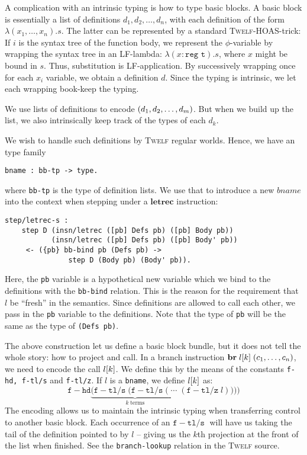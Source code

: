 \documentclass[a4paper, oneside, 10pt, draft]{memoir}
\newcommand{\twelf}{\textsc{Twelf}}
\begin{document}
A complication with an intrinsic typing is how to type basic blocks. A
basic block is essentially a list of definitions $d_1, d_2, \dotsc,
d_n$, with each definition of the form $\lambda (x_1, \dotsc,
x_n).s$. The latter can be represented by a standard \twelf{}-HOAS-trick:
If $i$ is the syntax tree of the function body, we represent the
$\phi$-variable by wrapping the syntax tree in an LF-lambda: $\lambda
(x : \texttt{reg t}) . s$, where $x$ might be bound in $s$. Thus,
substitution is LF-application. By successively wrapping once for each
$x_i$ variable, we obtain a definition $d$. Since the typing is
intrinsic, we let each wrapping book-keep the typing.

We use lists of definitions to encode $(d_1, d_2, \dotsc, d_m)$. But when we build up
the list, we also intrinsically keep track of the types of each $d_k$.

We wish to handle such definitions by \twelf{} regular worlds. Hence,
we have an type family
\begin{verbatim}
bname : bb-tp -> type.
\end{verbatim}
where \texttt{bb-tp} is the type of definition lists. We use that to
introduce a new $bname$ into the context when stepping under a
$\mathbf{letrec}$ instruction:
\begin{verbatim}
step/letrec-s :
    step D (insn/letrec ([pb] Defs pb) ([pb] Body pb))
           (insn/letrec ([pb] Defs pb) ([pb] Body' pb))
     <- ({pb} bb-bind pb (Defs pb) ->
               step D (Body pb) (Body' pb)).
\end{verbatim}
Here, the \texttt{pb} variable is a hypothetical new variable which we
bind to the definitions with the \texttt{bb-bind} relation. This is
the reason for the requirement that $l$ be ``fresh'' in the
semantics. Since definitions are allowed to call each other, we pass
in the \texttt{pb} variable to the definitions. Note that the type of
\texttt{pb} will be the same as the type of \texttt{(Defs pb)}.

The above construction let us define a basic block bundle, but it does
not tell the whole story: how to project and call. In a branch
instruction $\mathbf{br} \; l[k] \; (c_1, \dotsc, c_n)$, we need to encode the
call $l[k]$. We define this by the means of the constants
\texttt{f-hd, f-tl/s} and \texttt{f-tl/z}. If $l$ is a
\texttt{bname}, we define $l[k]$ as:
\newcommand{\fhd}{\mathtt{f\!\!-\!\!hd}}
\newcommand{\ftls}{\mathtt{f\!\!-\!\!tl/s}\; }
\newcommand{\ftlz}[1]{(\mathtt{f\!\!-\!\!tl/z} \; #1)}
\begin{equation*}
  \fhd \underbrace{(\ftls(\ftls ( \; \dotsb \; }_{k \; \text{terms}}\ftlz{l})))
\end{equation*}
The encoding allows us to maintain the intrinsic typing when transferring
control to another basic block. Each occurrence of an $\ftls$ will
have us taking the tail of the definition pointed to by $l$ -- giving
us the $k$th projection at the front of the list when finished. See
the \texttt{branch-lookup} relation in the \twelf{} source.
\end{document}
